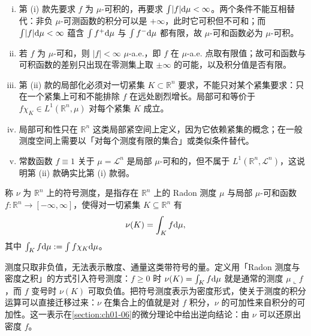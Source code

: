 \documentclass[../../main.tex]{subfiles}%
\begin{document}
\begin{remark}\label{remark:ch01-def-1-14-条件}
\begin{enumerate}[(i)]
\item 第 (i) 款先要求 $f$ 为 $\mu$-可积的，再要求 $\int\lvert f\rvert\mathrm{d}\mu<\infty$。两个条件不能互相替代：非负 $\mu$-可测函数的积分可以是 $+\infty$，此时它可积但不可和；而 $\int\lvert f\rvert\mathrm{d}\mu<\infty$ 蕴含 $\int f^{+}\mathrm{d}\mu$ 与 $\int f^{-}\mathrm{d}\mu$ 都有限，故 $\mu$-可和函数必为 $\mu$-可积。
\item 若 $f$ 为 $\mu$-可和，则 $\lvert f\rvert<\infty$ $\mu$-a.e.，即 $f$ 在 $\mu$-a.e. 点取有限值；故可和函数与可积函数的差别只出现在零测集上取 $\pm\infty$ 的可能，以及积分值是否有限。
\item 第 (ii) 款的局部化必须对一切紧集 $K\subset\mathbb{R}^n$ 要求，不能只对某个紧集要求：只在一个紧集上可和不能排除 $f$ 在远处剧烈增长。局部可和等价于 $f\chi_K\in L^1(\mathbb{R}^n,\mu)$ 对每个紧集 $K$ 成立。
\item 局部可和性只在 $\mathbb{R}^n$ 这类局部紧空间上定义，因为它依赖紧集的概念；在一般测度空间上需要以「对每个测度有限的集合」或类似条件替代。
\item 常数函数 $f\equiv1$ 关于 $\mu=\mathcal{L}^n$ 是局部 $\mu$-可和的，但不属于 $L^1(\mathbb{R}^n,\mathcal{L}^n)$，这说明第 (ii) 款确实比第 (i) 款弱。
\end{enumerate}
\end{remark}

\begin{definition}[符号测度]\label{definition:ch01-1-15}
称 $\nu$ 为 $\mathbb{R}^n$ 上的符号测度，是指存在 $\mathbb{R}^n$ 上的 Radon 测度 $\mu$ 与局部 $\mu$-可和函数 $f:\mathbb{R}^n\to[-\infty,\infty]$，使得对一切紧集 $K\subseteq\mathbb{R}^n$ 有
\begin{align}
\nu(K)=\int_{K}f\mathrm{d}\mu,\label{align:ch01-1-15-符号测度}
\end{align}
其中 $\int_{K}f\mathrm{d}\mu:=\int f\chi_{K}\mathrm{d}\mu$。
\end{definition}

\begin{remark}\label{remark:ch01-def-1-15-动机}
测度只取非负值，无法表示散度、通量这类带符号的量。定义用「Radon 测度与密度之积」的方式引入符号测度：$f\geqslant0$ 时 $\nu(K)=\int_{K}f\mathrm{d}\mu$ 就是通常的测度 $\mu\llcorner f$，而 $f$ 变号时 $\nu(K)$ 可取负值。把符号测度表示为密度形式，使关于测度的积分运算可以直接迁移过来：$\nu$ 在集合上的值就是对 $f$ 积分，$\nu$ 的可加性来自积分的可加性。这一表示在\cref{section:ch01-06}的微分理论中给出逆向结论：由 $\nu$ 可以还原出密度 $f$。%
\end{remark}
\end{document}
